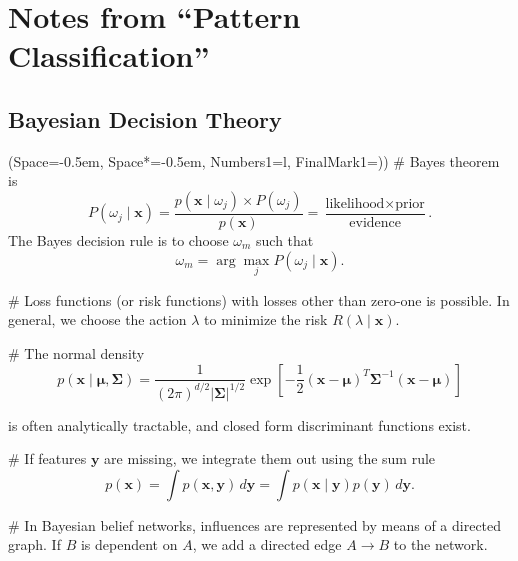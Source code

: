 \documentclass[12pt, a4paper]{article}
\title{\Title}
\author{\Author}
\newcommand{\listSpace}{-0.5em}%
\newcommand{\vect}[1]{\bm{#1}}
\newcommand{\abs}[1]{\left\lvert#1\right\rvert}
\begin{document}
	
\maketitle
\begin{abstract}
This document contains some notes and solutions to the book ``Pattern Classification'' by Duda et al.
\end{abstract}

\tableofcontents

\section{Notes from ``Pattern Classification''}
\setcounter{subsection}{1}
\subsection{Bayesian Decision Theory}
\begin{easylist}[itemize]
\ListProperties(Space=\listSpace, Space*=\listSpace, Numbers1=l, FinalMark1={)})
# Bayes theorem is
\begin{equation*}
	P(\omega_j \mid \vect{x}) = \frac{p(\vect{x} \mid \omega_j) \times P(\omega_j)}{p(\vect{x})}
	= \frac{\text{likelihood} \times \text{prior}}{\text{evidence}}.
\end{equation*}
The Bayes decision rule is to choose $\omega_m$ such that
\begin{equation*}
	\omega_m = \arg \max_j P(\omega_j \mid \vect{x}).
\end{equation*}

# Loss functions (or risk functions) with losses other than zero-one is possible.
 In general, we choose the action $\lambda$ to minimize the risk $R(\lambda \mid \vect{x})$.
 
# The normal density 
\begin{equation*}
	p(\vect{x} \mid \vect{\mu}, \vect{\Sigma}) = \frac{1}{(2 \pi)^{d/2} \abs{\vect{\Sigma}}^{1/2}} 
	\exp \left[ - \frac{1}{2} 
	\left( \vect{x} - \vect{\mu} \right)^T \vect{\Sigma}^{-1} 
	\left( \vect{x} - \vect{\mu} \right) \right]
\end{equation*}

is often analytically tractable, and closed form discriminant functions exist.

# If features $\vect{y}$ are missing, we integrate them out using the sum rule
\begin{equation*}
	p(\vect{x}) = \int p(\vect{x}, \vect{y}) \, d\vect{y} = \int p(\vect{x} \mid \vect{y}) p(\vect{y}) \, d\vect{y}.
\end{equation*}

# In Bayesian belief networks, influences are represented by means of a directed graph.
If $B$ is dependent on $A$, we add a directed edge $A \to B$ to the network.
\end{easylist}
\end{document}
